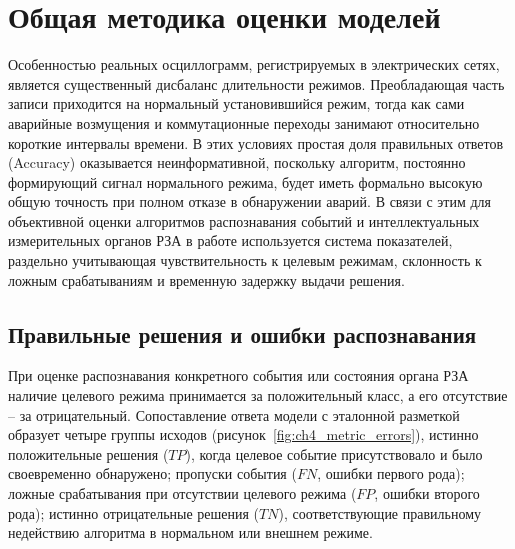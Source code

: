 \section{Общая методика оценки моделей}
\label{sec:ch4_evaluation_methodology}


Особенностью реальных осциллограмм, регистрируемых в электрических сетях,
является существенный дисбаланс длительности режимов. Преобладающая часть
записи приходится на нормальный установившийся режим, тогда как сами
аварийные возмущения и коммутационные переходы занимают относительно
короткие интервалы времени. В этих условиях простая доля правильных
ответов (Accuracy) оказывается неинформативной, поскольку алгоритм,
постоянно формирующий сигнал нормального режима, будет иметь формально
высокую общую точность при полном отказе в обнаружении аварий. В связи
с этим для объективной оценки алгоритмов распознавания событий и
интеллектуальных измерительных органов РЗА в работе используется система
показателей, раздельно учитывающая чувствительность к целевым режимам,
склонность к ложным срабатываниям и временную задержку выдачи решения.

\subsection{Правильные решения и ошибки распознавания}
\label{sec:ch4_metric_decisions}


При оценке распознавания конкретного события или состояния органа РЗА
наличие целевого режима принимается за положительный класс, а его
отсутствие -- за отрицательный. Сопоставление ответа модели с эталонной
разметкой образует четыре группы исходов (рисунок~\ref{fig:ch4_metric_errors}),
истинно положительные решения ($TP$), когда целевое событие присутствовало
и было своевременно обнаружено; пропуски события ($FN$, ошибки первого
рода); ложные срабатывания при отсутствии целевого режима ($FP$, ошибки
второго рода); истинно отрицательные решения ($TN$), соответствующие
правильному недействию алгоритма в нормальном или внешнем режиме.

